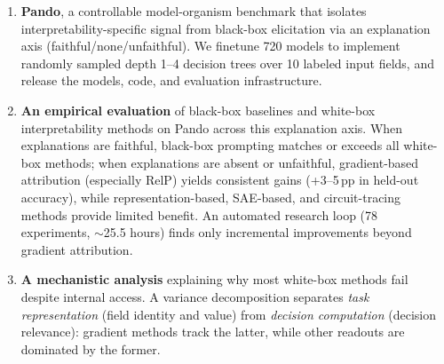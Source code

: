 \documentclass{article} %
\newcommand{\Cref}[1]{\ref{##1}}
\newcommand{\bench}{Pando}
\begin{document}
\begin{enumerate}[nosep,leftmargin=*]
    \item \textbf{\bench{}}, a controllable model-organism benchmark that isolates interpretability-specific signal from black-box elicitation via an explanation axis (faithful/none/unfaithful). We finetune 720 models to implement randomly sampled depth 1--4 decision trees over 10 labeled input fields, and release the models, code, and evaluation infrastructure.
    \item \textbf{An empirical evaluation} of black-box baselines and white-box interpretability methods on \bench{} across this explanation axis. When explanations are faithful, black-box prompting matches or exceeds all white-box methods; when explanations are absent or unfaithful, gradient-based attribution (especially RelP) yields consistent gains ({+3--5\,pp} in held-out accuracy), while representation-based, SAE-based, and circuit-tracing methods provide limited benefit. An automated research loop (78 experiments, ${\sim}$25.5 hours) finds only incremental improvements beyond gradient attribution.
    \item \textbf{A mechanistic analysis} explaining why most white-box methods fail despite internal access. A variance decomposition separates \emph{task representation} (field identity and value) from \emph{decision computation} (decision relevance): gradient methods track the latter, while other readouts are dominated by the former.
\end{enumerate}

\end{document}
